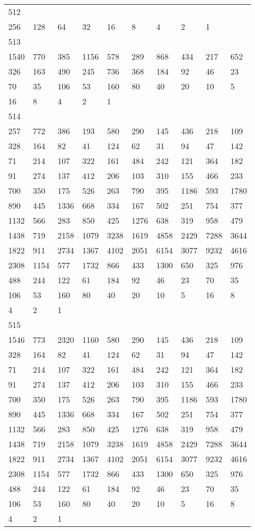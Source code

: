 \begin{longtable}{*{10}{l}}
512&&&&&&&&&\\
256& 128& 64& 32& 16& 8& 4& 2& 1& \\

513&&&&&&&&&\\
1540& 770& 385& 1156& 578& 289& 868& 434& 217& 652\\
326& 163& 490& 245& 736& 368& 184& 92& 46& 23\\
70& 35& 106& 53& 160& 80& 40& 20& 10& 5\\
16& 8& 4& 2& 1& \\

514&&&&&&&&&\\
257& 772& 386& 193& 580& 290& 145& 436& 218& 109\\
328& 164& 82& 41& 124& 62& 31& 94& 47& 142\\
71& 214& 107& 322& 161& 484& 242& 121& 364& 182\\
91& 274& 137& 412& 206& 103& 310& 155& 466& 233\\
700& 350& 175& 526& 263& 790& 395& 1186& 593& 1780\\
890& 445& 1336& 668& 334& 167& 502& 251& 754& 377\\
1132& 566& 283& 850& 425& 1276& 638& 319& 958& 479\\
1438& 719& 2158& 1079& 3238& 1619& 4858& 2429& 7288& 3644\\
1822& 911& 2734& 1367& 4102& 2051& 6154& 3077& 9232& 4616\\
2308& 1154& 577& 1732& 866& 433& 1300& 650& 325& 976\\
488& 244& 122& 61& 184& 92& 46& 23& 70& 35\\
106& 53& 160& 80& 40& 20& 10& 5& 16& 8\\
4& 2& 1& \\

515&&&&&&&&&\\
1546& 773& 2320& 1160& 580& 290& 145& 436& 218& 109\\
328& 164& 82& 41& 124& 62& 31& 94& 47& 142\\
71& 214& 107& 322& 161& 484& 242& 121& 364& 182\\
91& 274& 137& 412& 206& 103& 310& 155& 466& 233\\
700& 350& 175& 526& 263& 790& 395& 1186& 593& 1780\\
890& 445& 1336& 668& 334& 167& 502& 251& 754& 377\\
1132& 566& 283& 850& 425& 1276& 638& 319& 958& 479\\
1438& 719& 2158& 1079& 3238& 1619& 4858& 2429& 7288& 3644\\
1822& 911& 2734& 1367& 4102& 2051& 6154& 3077& 9232& 4616\\
2308& 1154& 577& 1732& 866& 433& 1300& 650& 325& 976\\
488& 244& 122& 61& 184& 92& 46& 23& 70& 35\\
106& 53& 160& 80& 40& 20& 10& 5& 16& 8\\
4& 2& 1& \\


\end{longtable}
